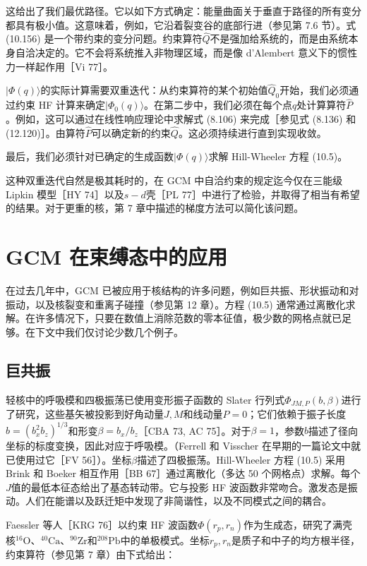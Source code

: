 这给出了我们最优路径。它以如下方式确定：能量曲面关于垂直于路径的所有变分都具有极小值。这意味着，例如，它沿着裂变谷的底部行进（参见第
7.6 节）。式 (10.156) 是一个带约束的变分问题。约束算符$\hat{Q}$不是强加给系统的，而是由系统本身自洽决定的。它不会将系统推入非物理区域，而是像
d'Alembert 意义下的惯性力一样起作用［Vi 77］。

$|\Phi(q)\rangle$的实际计算需要双重迭代：从约束算符的某个初始值$\hat{Q}_{0}$开始，我们必须通过约束
HF 计算来确定$|\Phi_{0}(q)\rangle$。在第二步中，我们必须在每个点$q$处计算算符$\hat{P}$。例如，这可以通过在线性响应理论中求解式
(8.106) 来完成［参见式 (8.136) 和 (12.120)］。由算符$\hat{P}$可以确定新的约束$\hat{Q}$。这必须持续进行直到实现收敛。

最后，我们必须针对已确定的生成函数$|\Phi(q)\rangle$求解 Hill-Wheeler 方程 (10.5)。

这种双重迭代自然是极其耗时的，在 GCM 中自洽约束的规定迄今仅在三能级 Lipkin 模型［HY 74］以及$s-d$壳［PL
77］中进行了检验，并取得了相当有希望的结果。对于更重的核，第 7 章中描述的梯度方法可以简化该问题。

\section{GCM 在束缚态中的应用}

在过去几年中，GCM 已被应用于核结构的许多问题，例如巨共振、形状振动和对振动，以及核裂变和重离子碰撞（参见第 12 章）。方程 (10.5)
通常通过离散化求解。在许多情况下，只要在数值上消除范数的零本征值，极少数的网格点就已足够。在下文中我们仅讨论少数几个例子。

\subsection{巨共振}

轻核中的呼吸模和四极振荡已使用变形振子函数的 Slater 行列式$\Phi_{JM,P}(b,\beta)$进行了研究，这些基矢被投影到好角动量$J,M$和线动量$P=0$；它们依赖于振子长度$b=(b^{2}_{x}b_{z})^{1/3}$和形变$\beta=b_{x}/b_{z}$［CBA
73, AC 75］。对于$\beta=1$，参数$b$描述了径向坐标的标度变换，因此对应于呼吸模。（Ferrell 和 Visscher
在早期的一篇论文中就已使用过它［FV 56］）。坐标$\beta$描述了四极振荡。Hill-Wheeler 方程 (10.5) 采用
Brink 和 Boeker 相互作用［BB 67］通过离散化（多达 50 个网格点）求解。每个$J$值的最低本征态给出了基态转动带。它与投影
HF 波函数非常吻合。激发态是振动。人们在能谱以及跃迁矩中发现了非简谐性，以及不同模式之间的耦合。

Faessler 等人［KRG 76］以约束 HF 波函数$\Phi(r_{p},r_{n})$作为生成态，研究了满壳核$^{16}\mathrm{O}$、$^{40}\mathrm{Ca}$、$^{90}\mathrm{Zr}$和$^{208}\mathrm{Pb}$中的单极模式。坐标$r_{p},r_{n}$是质子和中子的均方根半径，约束算符（参见第
7 章）由下式给出：

